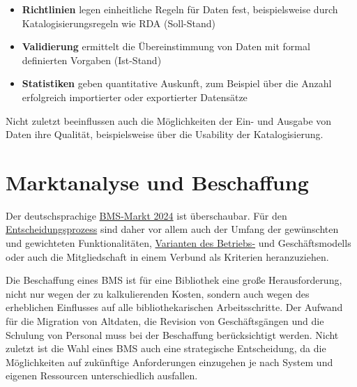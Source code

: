 \documentclass[
  11pt,
  letterpaper,
  DIV=11,
  twoside]{scrreprt}
\begin{document}
\begin{itemize}
\item
  \textbf{Richtlinien} legen einheitliche Regeln für Daten fest,
  beispielsweise durch Katalogisierungsregeln wie RDA (Soll-Stand)
\item
  \textbf{Validierung} ermittelt die Übereinstimmung von Daten mit
  formal definierten Vorgaben (Ist-Stand)
\item
  \textbf{Statistiken} geben quantitative Auskunft, zum Beispiel über
  die Anzahl erfolgreich importierter oder exportierter Datensätze
\end{itemize}

Nicht zuletzt beeinflussen auch die Möglichkeiten der Ein- und Ausgabe
von Daten ihre Qualität, beispielsweise über die Usability der
Katalogisierung.

\section{Marktanalyse und
Beschaffung}\label{marktanalyse-und-beschaffung}

\begin{tcolorbox}[enhanced jigsaw, leftrule=.75mm, toprule=.15mm, left=2mm, opacityback=0, arc=.35mm, colback=white, breakable, colframe=quarto-callout-tip-color-frame, rightrule=.15mm, bottomrule=.15mm]
\begin{minipage}[t]{5.5mm}
\textcolor{quarto-callout-tip-color}{\faLightbulb}
\end{minipage}%
\begin{minipage}[t]{\textwidth - 5.5mm}

Der deutschsprachige \hyperref[tbl-aktuelle-sw-produkte]{BMS-Markt 2024}
ist überschaubar. Für den
\hyperref[entscheidungsprozess]{Entscheidungsprozess} sind daher vor
allem auch der Umfang der gewünschten und gewichteten Funktionalitäten,
\hyperref[sec-betriebsmodelle]{Varianten des Betriebs-} und
Geschäftsmodells oder auch die Mitgliedschaft in einem Verbund als
Kriterien heranzuziehen.

\end{minipage}%
\end{tcolorbox}

Die Beschaffung eines BMS ist für eine Bibliothek eine große
Herausforderung, nicht nur wegen der zu kalkulierenden Kosten, sondern
auch wegen des erheblichen Einflusses auf alle bibliothekarischen
Arbeitsschritte. Der Aufwand für die Migration von Altdaten, die
Revision von Geschäftsgängen und die Schulung von Personal muss bei der
Beschaffung berücksichtigt werden. Nicht zuletzt ist die Wahl eines BMS
auch eine strategische Entscheidung, da die Möglichkeiten auf zukünftige
Anforderungen einzugehen je nach System und eigenen Ressourcen
unterschiedlich ausfallen.
\end{document}
